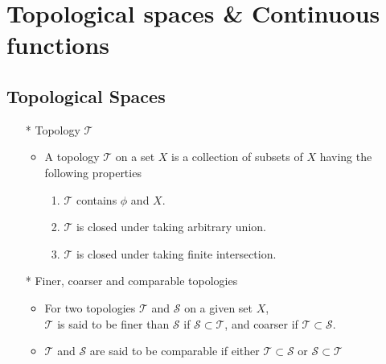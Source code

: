 \documentclass[12pt]{article}
\begin{document}
\section{Topological spaces \& Continuous functions}
\bigskip
\subsection{Topological Spaces}
\smallskip
\begin{itemize}
	\item[*]Topology $\mathcal{T}$
	\begin{itemize}
		\item A topology $\mathcal{T}$ on a set $X$ is a collection of subsets of $X$ having the following properties
		\begin{enumerate}
			\item $\mathcal{T}$ contains $\phi$ and $X$.
			\item $\mathcal{T}$ is closed under taking arbitrary union.
			\item $\mathcal{T}$ is closed under taking finite intersection.
		\end{enumerate}
	\end{itemize}
	\item[*]Finer, coarser and comparable topologies
	\begin{itemize}
		\item For two topologies $\mathcal{T}$ and $\mathcal{S}$ on a given set $X$,\\ $\mathcal{T}$ is said to be finer than $\mathcal{S}$ if $\mathcal{S}\subset \mathcal{T}$, and coarser if $\mathcal{T}\subset \mathcal{S}$. 
		\item $\mathcal{T}$ and $\mathcal{S}$ are said to be comparable if either $\mathcal{T}\subset \mathcal{S}$ or $\mathcal{S} \subset \mathcal{T}$
	\end{itemize}
\end{itemize}
\bigskip	
\end{document}

